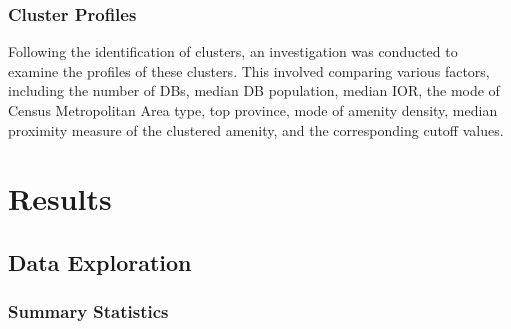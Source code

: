 \documentclass[11pt, a4paper]{article}
\begin{document}
\subsubsection{Cluster Profiles}


Following the identification of clusters, an investigation was conducted to examine the profiles of these clusters. This involved comparing various factors, including the number of DBs, median DB population, median IOR, the mode of Census Metropolitan Area type, top province, mode of amenity density, median proximity measure of the clustered amenity, and the corresponding cutoff values.





















\pagebreak 
\section{Results}




\subsection{Data Exploration}

\subsubsection{Summary Statistics}
\end{document}
